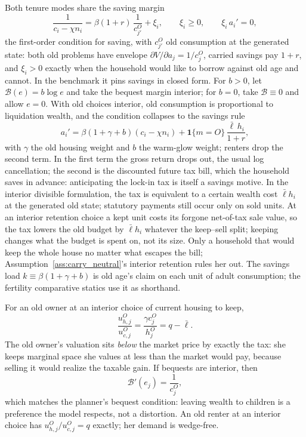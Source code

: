 \documentclass[11pt]{article}
\newcommand{\1}{\mathbf 1}
\begin{document}
Both tenure modes share the saving margin
\begin{equation}
\frac{1}{c_i-\chi n_i}
=
\beta(1+r)\,
\frac{1}{c_{j'}^O}
+\xi_i,
\qquad
\xi_i\ge0,
\qquad
\xi_i\,a_i'=0,
\label{eq:compact_euler}
\end{equation}
the first-order condition for saving, with $c_{j'}^O$ old consumption at the generated state: both old problems have envelope $\partial V/\partial a_j=1/c_j^O$, carried savings pay $1+r$, and $\xi_i>0$ exactly when the household would like to borrow against old age and cannot. In the benchmark it pins savings in closed form. For $b>0$, let $\mathcal B(e)=b\log e$ and take the bequest margin interior; for $b=0$, take $\mathcal B\equiv0$ and allow $e=0$. With old choices interior, old consumption is proportional to liquidation wealth, and the condition collapses to the savings rule
\begin{equation}
a_i'=\beta\left(1+\gamma+b\right)(c_i-\chi n_i)+\1\{m=O\}\,\frac{\bar\ell\,h_i}{1+r},
\label{eq:compact_savings_rule}
\end{equation}
with $\gamma$ the old housing weight and $b$ the warm-glow weight; renters drop the second term. In the first term the gross return drops out, the usual log cancellation; the second is the discounted future tax bill, which the household saves in advance: anticipating the lock-in tax is itself a savings motive. In the interior divisible formulation, the tax is equivalent to a certain wealth cost $\bar\ell h_i$ at the generated old state; statutory payments still occur only on sold units. At an interior retention choice a kept unit costs its forgone net-of-tax sale value, so the tax lowers the old budget by $\bar\ell h_i$ whatever the keep--sell split; keeping changes what the budget is spent on, not its size. Only a household that would keep the whole house no matter what escapes the bill; Assumption~\ref{ass:carry_neutral}'s interior retention rules her out. The savings load $k\equiv\beta(1+\gamma+b)$ is old age's claim on each unit of adult consumption; the fertility comparative statics use it as shorthand.

For an old owner at an interior choice of current housing to keep,
\begin{equation}
\frac{u^O_{h,j}}{u^O_{c,j}}
=
\frac{\gamma c_j^O}{h_j^O}
=
q-\bar\ell.
\label{eq:compact_old_mv}
\end{equation}
The old owner's valuation sits \emph{below} the market price by exactly the tax: she keeps marginal space she values at less than the market would pay, because selling it would realize the taxable gain. If bequests are interior, then
\[
\mathcal B'(e_j)=\frac{1}{c_j^O},
\]
which matches the planner's bequest condition: leaving wealth to children is a preference the model respects, not a distortion. An old renter at an interior choice has $u^O_{h,j}/u^O_{c,j}=q$ exactly; her demand is wedge-free.
\end{document}
